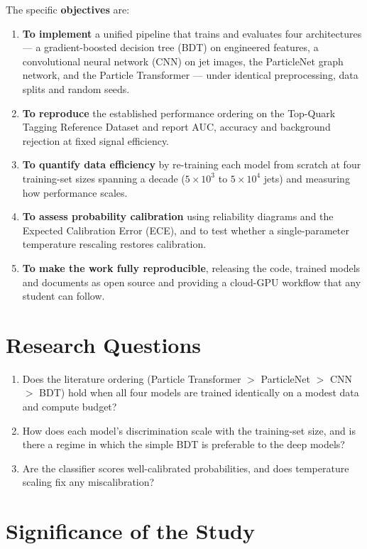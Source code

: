 The specific \textbf{objectives} are:
\begin{enumerate}
    \item \textbf{To implement} a unified pipeline that trains and evaluates
    four architectures --- a gradient-boosted decision tree (BDT) on
    engineered features, a convolutional neural network (CNN) on jet images,
    the ParticleNet graph network, and the Particle Transformer --- under
    identical preprocessing, data splits and random seeds.
    \item \textbf{To reproduce} the established performance ordering on the
    Top-Quark Tagging Reference Dataset and report AUC, accuracy and
    background rejection at fixed signal efficiency.
    \item \textbf{To quantify data efficiency} by re-training each model from
    scratch at four training-set sizes spanning a decade
    ($5\times10^{3}$ to $5\times10^{4}$ jets) and measuring how performance
    scales.
    \item \textbf{To assess probability calibration} using reliability
    diagrams and the Expected Calibration Error (ECE), and to test whether a
    single-parameter temperature rescaling restores calibration.
    \item \textbf{To make the work fully reproducible}, releasing the code,
    trained models and documents as open source and providing a cloud-GPU
    workflow that any student can follow.
\end{enumerate}

\section{Research Questions}
\label{sec:research_questions}

\begin{enumerate}
    \item Does the literature ordering (Particle Transformer $>$ ParticleNet
    $>$ CNN $>$ BDT) hold when all four models are trained identically on a
    modest data and compute budget?
    \item How does each model's discrimination scale with the training-set
    size, and is there a regime in which the simple BDT is preferable to the
    deep models?
    \item Are the classifier scores well-calibrated probabilities, and does
    temperature scaling fix any miscalibration?
\end{enumerate}

\section{Significance of the Study}
\label{sec:significance}

